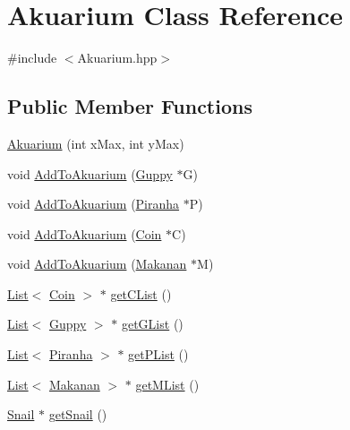 \hypertarget{class_akuarium}{}\section{Akuarium Class Reference}
\label{class_akuarium}


{\ttfamily \#include $<$Akuarium.\+hpp$>$}

\subsection*{Public Member Functions}
\begin{DoxyCompactItemize}
\item 
\mbox{\hyperlink{class_akuarium_a09356fa0405a5c8db4b048665456e1ce}{Akuarium}} (int x\+Max, int y\+Max)
\item 
void \mbox{\hyperlink{class_akuarium_acd7f2fd40ce2ca063c3ddfacf1a84ea3}{Add\+To\+Akuarium}} (\mbox{\hyperlink{class_guppy}{Guppy}} $\ast$G)
\item 
void \mbox{\hyperlink{class_akuarium_a167b796ece0cdd537c5c6624ed15760c}{Add\+To\+Akuarium}} (\mbox{\hyperlink{class_piranha}{Piranha}} $\ast$P)
\item 
void \mbox{\hyperlink{class_akuarium_a1f4f9363a6d7293e24768b6f70ee2eae}{Add\+To\+Akuarium}} (\mbox{\hyperlink{class_coin}{Coin}} $\ast$C)
\item 
void \mbox{\hyperlink{class_akuarium_a83bb5abf33474615c762124429a350be}{Add\+To\+Akuarium}} (\mbox{\hyperlink{class_makanan}{Makanan}} $\ast$M)
\item 
\mbox{\hyperlink{class_list}{List}}$<$ \mbox{\hyperlink{class_coin}{Coin}} $>$ $\ast$ \mbox{\hyperlink{class_akuarium_a8eebf8e6e312dee21e4d790de5e6f614}{get\+C\+List}} ()
\item 
\mbox{\hyperlink{class_list}{List}}$<$ \mbox{\hyperlink{class_guppy}{Guppy}} $>$ $\ast$ \mbox{\hyperlink{class_akuarium_aea95fa5feed9d17dd8cee6a716413222}{get\+G\+List}} ()
\item 
\mbox{\hyperlink{class_list}{List}}$<$ \mbox{\hyperlink{class_piranha}{Piranha}} $>$ $\ast$ \mbox{\hyperlink{class_akuarium_ad6e04ad77928d85f6739b76c9efaaa67}{get\+P\+List}} ()
\item 
\mbox{\hyperlink{class_list}{List}}$<$ \mbox{\hyperlink{class_makanan}{Makanan}} $>$ $\ast$ \mbox{\hyperlink{class_akuarium_aceb32b9271d3de1c5383151d68a16cdb}{get\+M\+List}} ()
\item 
\mbox{\hyperlink{class_snail}{Snail}} $\ast$ \mbox{\hyperlink{class_akuarium_a846c24525e4bec5b355e34924d8a5784}{get\+Snail}} ()

\end{DoxyCompactItemize}
